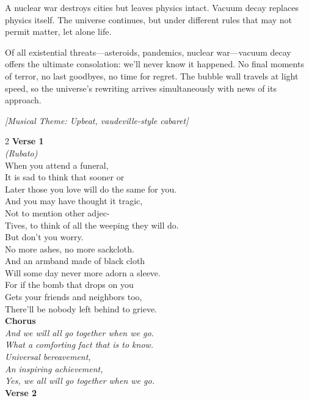 A nuclear war destroys cities but leaves physics intact. Vacuum decay replaces physics itself. The universe continues, but under different rules that may not permit matter, let alone life.

\newpage

\begin{commentary}
Of all existential threats—asteroids, pandemics, nuclear war—vacuum decay offers the ultimate consolation: we'll never know it happened. No final moments of terror, no last goodbyes, no time for regret. The bubble wall travels at light speed, so the universe's rewriting arrives simultaneously with news of its approach.

\noindent\textit{[Musical Theme: Upbeat, vaudeville-style cabaret]}
\begin{multicols}{2}
\small
\noindent\textbf{Verse 1}\\[0.15em]
\textit{(Rubato)}\\
When you attend a funeral,\\
It is sad to think that sooner or\\
Later those you love will do the same for you.\\
And you may have thought it tragic,\\
Not to mention other adjec-\\
Tives, to think of all the weeping they will do.\\
But don't you worry.\\
No more ashes, no more sackcloth.\\
And an armband made of black cloth\\
Will some day never more adorn a sleeve.\\
For if the bomb that drops on you\\
Gets your friends and neighbors too,\\
There'll be nobody left behind to grieve.\\[0.3em]
\noindent\textbf{Chorus}\\[0.15em]
\textit{And we will all go together when we go.}\\
\textit{What a comforting fact that is to know.}\\
\textit{Universal bereavement,}\\
\textit{An inspiring achievement,}\\
\textit{Yes, we all will go together when we go.}\\[0.3em]
\noindent\textbf{Verse 2}\\[0.15em]

\end{multicols}
\end{commentary}
